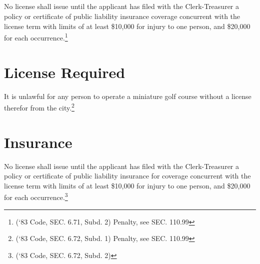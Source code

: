 \subsection{}
No license shall issue until the applicant has filed with the Clerk-Treasurer a policy or certificate of public liability insurance coverage concurrent with the license term with limits of at least \$10,000 for injury to one person, and \$20,000 for each occurrence.\footnote{(‘83 Code, SEC. 6.71, Subd. 2)  Penalty, see SEC. 110.99}\\


\setcounter{section}{74}
\section{License Required}
It is unlawful for any person to operate a miniature golf course without a license therefor from the city.\footnote{(‘83 Code, SEC. 6.72, Subd. 1)  Penalty, see SEC. 110.99}

\section{Insurance}
No license shall issue until the applicant has filed with the Clerk-Treasurer a policy or certificate of public liability insurance for coverage concurrent with the license term with limits of at least \$10,000 for injury to one person, and \$20,000 for each occurrence.\footnote{(‘83 Code, SEC. 6.72, Subd. 2)}
